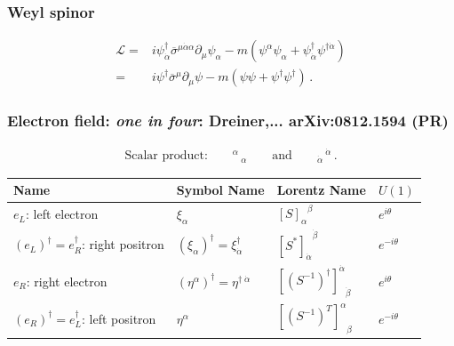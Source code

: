 \documentclass[%
xcolor=dvipsnames,table%
]{beamer}
\begin{document}
\begin{frame}
  \frametitle{Weyl spinor}
  \begin{align}
  \mathcal{L}=&i{\psi}^{\dagger}_{\dot{\alpha}}\overline{\sigma}^{\mu \dot{\alpha}\alpha}\partial_\mu\psi_{\alpha}-
m \left( \psi^{\alpha}\psi_{\alpha}+\psi^{\dagger}_{\dot{\alpha}}\psi^{\dagger \dot{\alpha}} \right) \nonumber\\
=&i{\psi}^{\dagger}\overline{\sigma}^\mu\partial_\mu\psi-
m \left( \psi\psi+\psi^{\dagger}\psi^{\dagger} \right)\,.
\end{align}


\end{frame}

\begin{frame}
  \frametitle{Electron field: \emph{one in four}: Dreiner,... arXiv:0812.1594 (PR)}
\vspace{-0.7cm}

\begin{align*}
\text{Scalar product:}\qquad  {{}^{\alpha}}\,{}_{\alpha}\qquad \text{and}\qquad {{}_{\dot{\alpha}}}\,{}^{\dot{\alpha}}\,.
\end{align*}
    \begin{tabular}{llll}
    Name \hspace{4cm} & Symbol Name \hspace{1.5cm} & Lorentz Name \hspace{1.5cm} & $U(1)$\\\hline
    $e_L$: left electron  & $\xi_{\alpha}$ & ${\left[ S \right]_{\alpha}}^{\beta}$ & $e^{i\theta}$\\
   $\left( e_L \right)^{\dagger}=e^{\dagger}_R$: right positron    & $\left( \xi_{\alpha} \right)^{\dagger}=\xi^{\dagger}_{\dot{\alpha}}$ & ${\left[{S^{*}}\right]_{\dot{\alpha}}}^{\dot{\beta}}$ & $e^{-i\theta}$\\
   $e_R$: right electron    & $\left( \eta^{\alpha} \right)^{\dagger}=\eta^{\dagger\;\dot{\alpha}}$ & ${\left[ \left( S^{-1} \right)^\dagger \right]^{\dot{\alpha}}}_{\dot{\beta}}$& $e^{i\theta}$\\
   $\left( e_R \right)^{\dagger}=e^{\dagger}_L$: left positron&$\eta^{\alpha}$& ${\left[ \left( S^{-1} \right)^T \right]^{\alpha}}_{\beta}$ & $e^{-i\theta}$\\\hline
  \end{tabular}


\end{frame}
\end{document}
